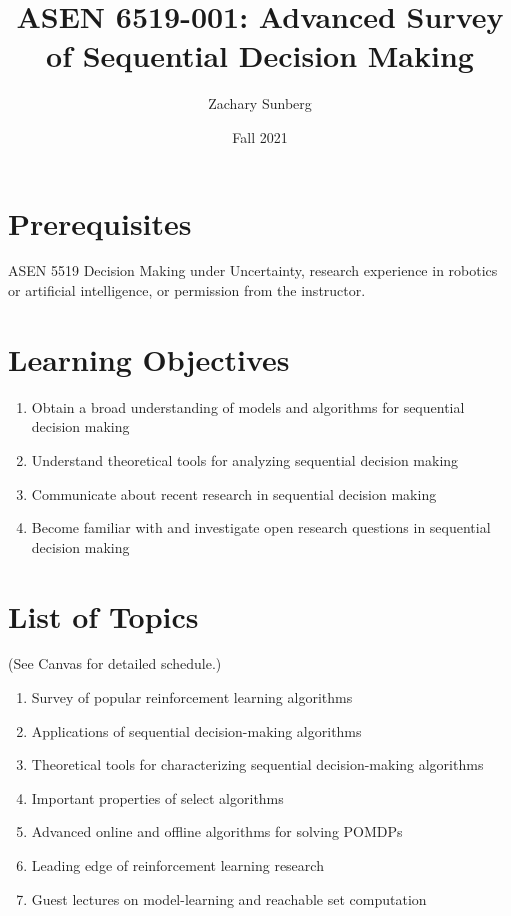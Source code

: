 \documentclass[9pt]{article}
\title{ASEN 6519-001: Advanced Survey of Sequential Decision Making}
\author{Zachary Sunberg}
\date{Fall 2021}
\begin{document}
\maketitle

\section*{Prerequisites}

ASEN 5519 Decision Making under Uncertainty, research experience in robotics or artificial intelligence, or permission from the instructor.

\section*{Learning Objectives}

\begin{enumerate}[nosep]
    \item Obtain a broad understanding of models and algorithms for sequential decision making
    \item Understand theoretical tools for analyzing sequential decision making
    \item Communicate about recent research in sequential decision making
    \item Become familiar with and investigate open research questions in sequential decision making
\end{enumerate}

\section*{List of Topics}

(See Canvas for detailed schedule.)

\begin{enumerate}[nosep]
    \item Survey of popular reinforcement learning algorithms
    \item Applications of sequential decision-making algorithms
    \item Theoretical tools for characterizing sequential decision-making algorithms
    \item Important properties of select algorithms
    \item Advanced online and offline algorithms for solving POMDPs
    \item Leading edge of reinforcement learning research
    \item Guest lectures on model-learning and reachable set computation
\end{enumerate}
\end{document}
